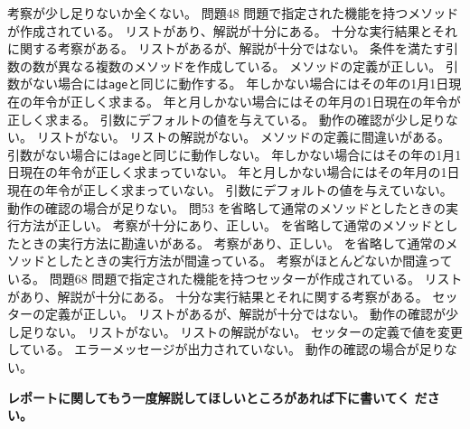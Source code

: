 {{ {考察が少し足りないか全くない。}
 }
 {問題4}{8}{
 {問題で指定された機能を持つメソッドが作成されている。}
 {リストがあり、解説が十分にある。}
 {十分な実行結果とそれに関する考察がある。}
 }
 {
 {リストがあるが、解説が十分ではない。}
 {条件を満たす引数の数が異なる複数のメソッドを作成している。}
 {メソッドの定義が正しい。}
 {引数がない場合には\texttt{age}と同じに動作する。}
 {年しかない場合にはその年の1月1日現在の年令が正しく求まる。}
 {年と月しかない場合にはその年月の1日現在の年令が正しく求まる。}
 {引数にデフォルトの値を与えている。}
 {動作の確認が少し足りない。}
 }
 {
 {リストがない。}
 {リストの解説がない。}
 {メソッドの定義に間違いがある。}
 {引数がない場合には\texttt{age}と同じに動作しない。}
 {年しかない場合にはその年の1月1日現在の年令が正しく求まっていない。}
 {年と月しかない場合にはその年月の1日現在の年令が正しく求まっていない。}
 {引数にデフォルトの値を与えていない。}
 {動作の確認の場合が足りない。}
 }
 {問5}{3}{
 {を省略して通常のメソッドとしたときの実行方法が正しい。}
 {考察が十分にあり、正しい。}
 }
 {
 {を省略して通常のメソッドとしたときの実行方法に勘違いがある。}
 {考察があり、正しい。}
 }
 {
 {を省略して通常のメソッドとしたときの実行方法が間違っている。}
 {考察がほとんどないか間違っている。}
 }
 {問題6}{8}{
 {問題で指定された機能を持つセッターが作成されている。}
 {リストがあり、解説が十分にある。}
 {十分な実行結果とそれに関する考察がある。}
 }
 {
 {セッターの定義が正しい。}
 {リストがあるが、解説が十分ではない。}
 {動作の確認が少し足りない。}
 }
 {
 {リストがない。}
 {リストの解説がない。}
 {セッターの定義で値を変更している。}
 {エラーメッセージが出力されていない。}
 {動作の確認の場合が足りない。}
 }
 }

 {\bfseries レポートに関してもう一度解説してほしいところがあれば下に書いてく
 ださい。}